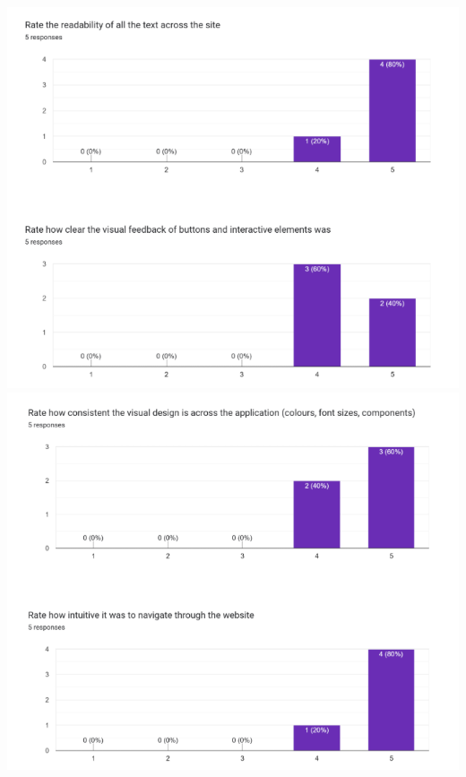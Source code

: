 \documentclass[12pt, titlepage]{article}
\begin{document}
\begin{centering}
\includegraphics[scale=0.7]{chart_2_1.png}\\
\includegraphics[scale=0.7]{chart_2_2.png}\\

\end{centering}
\end{document}

